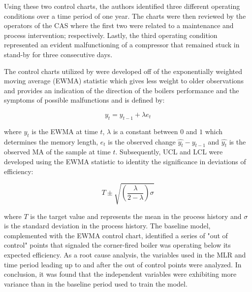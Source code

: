 Using these two control charts, the authors identified three different operating conditions over a time period of one year. The charts were then reviewed by the operators of the CAS where the first two were related to a maintenance and process intervention; respectively. Lastly, the third operating condition represented an evident malfunctioning of a compressor that remained stuck in stand-by for three consecutive days.


The control charts utilized by \cite{boiler} were developed off of the exponentially weighted moving average (EWMA) statistic which gives less weight to older observations and provides an indication of the direction of the boilers performance and the symptoms of possible malfunctions and is defined by:

$$y_t = y_{t-1} + \lambda e_t$$

where $y_t$ is the EWMA at time $t$, $\lambda$ is a constant between $0$ and $1$ which determines the memory length, $e_t$ is the observed change $\hat{y_t} - y_{t-1}$ and $\hat{y_t}$ is the observed MA of the sample at time $t$. Subsequently, UCL and LCL were developed using the EWMA statistic to identity the significance in deviations of efficiency:

$$T \pm \sqrt{(\frac{\lambda}{2 - \lambda})\sigma}$$

where $T$ is the target value and represents the mean in the process history and $\sigma$ is the standard deviation in the process history. The baseline model, complemented with the EWMA control chart, identified a series of "out of control" points that signaled the corner-fired boiler was operating below its expected efficiency. As a root cause analysis, the variables used in the MLR and time period leading up to and after the out of control points were analyzed. In conclusion, it was found that the independent variables were exhibiting more variance than in the baseline period used to train the model.